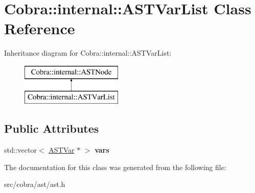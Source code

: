 \hypertarget{class_cobra_1_1internal_1_1_a_s_t_var_list}{\section{Cobra\+:\+:internal\+:\+:A\+S\+T\+Var\+List Class Reference}
\label{class_cobra_1_1internal_1_1_a_s_t_var_list}
}
Inheritance diagram for Cobra\+:\+:internal\+:\+:A\+S\+T\+Var\+List\+:\begin{figure}[H]
\begin{center}
\leavevmode
\includegraphics[height=2.000000cm]{class_cobra_1_1internal_1_1_a_s_t_var_list}
\end{center}
\end{figure}
\subsection*{Public Attributes}
\begin{DoxyCompactItemize}
\item 
\hypertarget{class_cobra_1_1internal_1_1_a_s_t_var_list_a51688944830f960f8e29e4019d46148a}{std\+::vector$<$ \hyperlink{class_cobra_1_1internal_1_1_a_s_t_var}{A\+S\+T\+Var} $\ast$ $>$ {\bfseries vars}}\label{class_cobra_1_1internal_1_1_a_s_t_var_list_a51688944830f960f8e29e4019d46148a}

\end{DoxyCompactItemize}


The documentation for this class was generated from the following file\+:\begin{DoxyCompactItemize}
\item 
src/cobra/ast/ast.\+h\end{DoxyCompactItemize}
